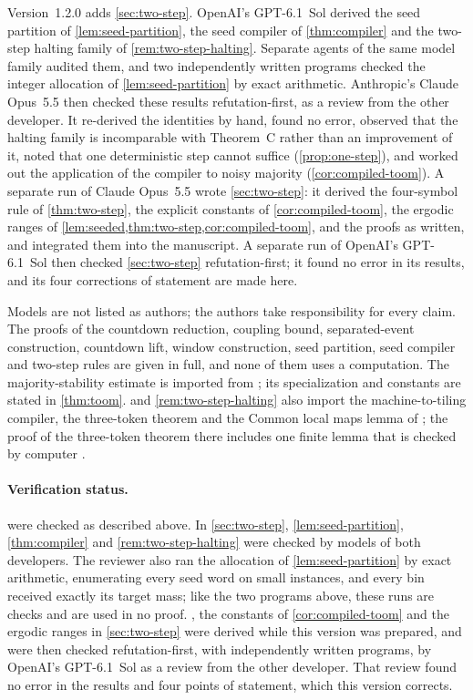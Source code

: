 \documentclass[11pt]{article}
\theoremstyle{plain}
\theoremstyle{definition}
\theoremstyle{remark}
\begin{document}
Version~1.2.0 adds \cref{sec:two-step}. OpenAI's GPT-6.1~Sol derived the seed partition of \cref{lem:seed-partition}, the seed compiler of \cref{thm:compiler} and the two-step halting family of \cref{rem:two-step-halting}. Separate agents of the same model family audited them, and two independently written programs checked the integer allocation of \cref{lem:seed-partition} by exact arithmetic. Anthropic's Claude Opus~5.5 then checked these results refutation-first, as a review from the other developer. It re-derived the identities by hand, found no error, observed that the halting family is incomparable with Theorem~C rather than an improvement of it, noted that one deterministic step cannot suffice (\cref{prop:one-step}), and worked out the application of the compiler to noisy majority (\cref{cor:compiled-toom}). A separate run of Claude Opus~5.5 wrote \cref{sec:two-step}: it derived the four-symbol rule of \cref{thm:two-step}, the explicit constants of \cref{cor:compiled-toom}, the ergodic ranges of \cref{lem:seeded,thm:two-step,cor:compiled-toom}, and the proofs as written, and integrated them into the manuscript. A separate run of OpenAI's GPT-6.1~Sol then checked \cref{sec:two-step} refutation-first; it found no error in its results, and its four corrections of statement are made here.

Models are not listed as authors; the authors take responsibility for every claim. The proofs of the countdown reduction, coupling bound, separated-event construction, countdown lift, window construction, seed partition, seed compiler and two-step rules are given in full, and none of them uses a computation. The majority-stability estimate is imported from \cite{Gacs21}; its specialization and constants are stated in \cref{thm:toom}.  and \cref{rem:two-step-halting} also import the machine-to-tiling compiler, the three-token theorem and the Common local maps lemma of \cite{DM26A}; the proof of the three-token theorem there includes one finite lemma that is checked by computer \cite[Lemma~9.12]{DM26A}.

\paragraph{Verification status.}
 were checked as described above. In \cref{sec:two-step}, \cref{lem:seed-partition}, \cref{thm:compiler} and \cref{rem:two-step-halting} were checked by models of both developers. The reviewer also ran the allocation of \cref{lem:seed-partition} by exact arithmetic, enumerating every seed word on small instances, and every bin received exactly its target mass; like the two programs above, these runs are checks and are used in no proof. , the constants of \cref{cor:compiled-toom} and the ergodic ranges in \cref{sec:two-step} were derived while this version was prepared, and were then checked refutation-first, with independently written programs, by OpenAI's GPT-6.1~Sol as a review from the other developer. That review found no error in the results and four points of statement, which this version corrects.
\end{document}
